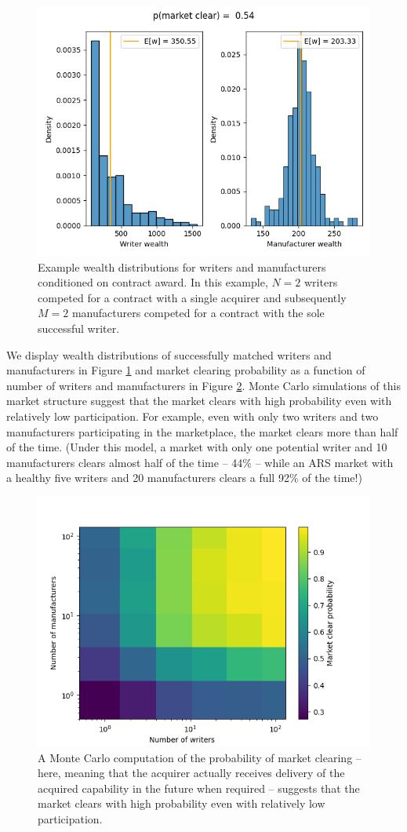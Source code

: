 \documentclass{article}
\begin{document}
\begin{figure}
    \centering
    \includegraphics[width=0.75\linewidth]{simulation-agent-wealth.png}
    \caption{
    Example wealth distributions for writers and manufacturers conditioned on
    contract award. In this example, $N=2$ writers competed for a contract with a single acquirer and subsequently $M=2$ manufacturers competed for a contract with the sole successful writer.
    }
    \label{fig:simulation-agent-wealth}
\end{figure}

We display wealth distributions of successfully matched writers and manufacturers in Figure \ref{fig:simulation-agent-wealth} and market clearing probability as a function of number of writers and manufacturers in Figure \ref{fig:simulation-market-clear}.
Monte Carlo simulations of this market structure suggest that the market clears with high probability even with relatively low participation.
For example, even with only two writers and two manufacturers participating in the marketplace, the market clears more than half of the time. (Under this model, a market with only one potential writer and 10 manufacturers clears almost half of the time -- 44\% -- while an ARS market with a healthy five writers and 20 manufacturers clears a full 92\% of the time!)

\begin{figure}
    \centering
    \includegraphics[width=0.75\linewidth]{simulation-market-clear.png}
    \caption{
    A Monte Carlo computation of the probability of market clearing -- here, meaning that the acquirer actually receives delivery of the acquired capability in the future when required -- suggests that the market clears with high probability even with relatively low participation.
    }
    \label{fig:simulation-market-clear}
\end{figure}
\end{document}
